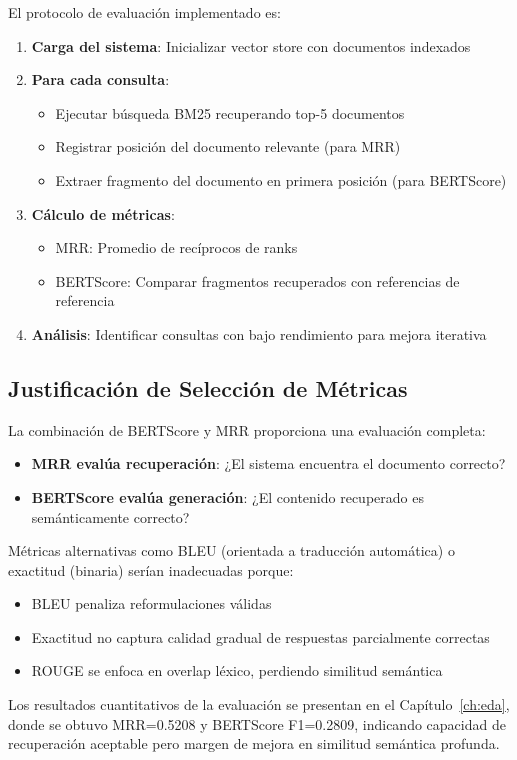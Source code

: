 El protocolo de evaluación implementado es:

\begin{enumerate}
    \item \textbf{Carga del sistema}: Inicializar vector store con documentos indexados
    \item \textbf{Para cada consulta}:
    \begin{itemize}
        \item Ejecutar búsqueda BM25 recuperando top-5 documentos
        \item Registrar posición del documento relevante (para MRR)
        \item Extraer fragmento del documento en primera posición (para BERTScore)
    \end{itemize}
    \item \textbf{Cálculo de métricas}:
    \begin{itemize}
        \item MRR: Promedio de recíprocos de ranks
        \item BERTScore: Comparar fragmentos recuperados con referencias de referencia
    \end{itemize}
    \item \textbf{Análisis}: Identificar consultas con bajo rendimiento para mejora iterativa
\end{enumerate}

\subsection{Justificación de Selección de Métricas}

La combinación de BERTScore y MRR proporciona una evaluación completa:

\begin{itemize}
    \item \textbf{MRR evalúa recuperación}: ¿El sistema encuentra el documento correcto?
    \item \textbf{BERTScore evalúa generación}: ¿El contenido recuperado es semánticamente correcto?
\end{itemize}

Métricas alternativas como BLEU (orientada a traducción automática) o exactitud (binaria) serían inadecuadas porque:

\begin{itemize}
    \item BLEU penaliza reformulaciones válidas
    \item Exactitud no captura calidad gradual de respuestas parcialmente correctas
    \item ROUGE se enfoca en overlap léxico, perdiendo similitud semántica
\end{itemize}

Los resultados cuantitativos de la evaluación se presentan en el Capítulo~\ref{ch:eda}, donde se obtuvo MRR=0.5208 y BERTScore F1=0.2809, indicando capacidad de recuperación aceptable pero margen de mejora en similitud semántica profunda.

